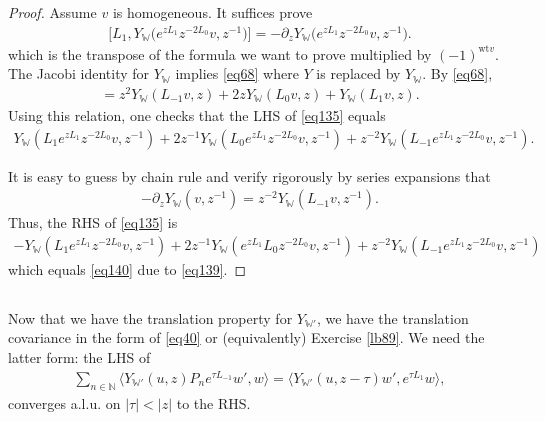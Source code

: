 \documentclass[12pt,a4paper,notitlepage]{article}
\theoremstyle{definition}
\theoremstyle{plain}
\newcommand{\bigbk}[1]{\big\langle {#1}\big\rangle}
\newcommand{\Wbb}{\mathbb W}
\newcommand{\Nbb}{\mathbb N}
\newcommand{\wt}{\mathrm{wt}}
\numberwithin{equation}{section}
\begin{document}
\begin{proof}
Assume $v$ is homogeneous. It suffices prove 
\begin{align}
\big[L_1,Y_\Wbb\big(e^{zL_1}z^{-2L_0}v,z^{-1}\big)\big]=-\partial_zY_\Wbb\big(e^{zL_1}z^{-2L_0}v,z^{-1}\big).\label{eq135}	
\end{align}
which is the transpose of the formula we want to prove multiplied by $(-1)^{\wt v}$. The Jacobi identity for $Y_\Wbb$ implies \eqref{eq68} where $Y$ is replaced by $Y_\Wbb$. By \eqref{eq68},
\begin{align}
	[L_1,Y_\Wbb(v,z)]=z^2Y_\Wbb(L_{-1}v,z)+2zY_\Wbb(L_0v,z)+Y_\Wbb(L_1v,z).	
\end{align}
Using this relation, one checks that the LHS of \eqref{eq135} equals
\begin{align}
Y_\Wbb(L_1e^{zL_1}z^{-2L_0}v,z^{-1})+2z^{-1}Y_\Wbb(L_0e^{zL_1}z^{-2L_0}v,z^{-1})+z^{-2}Y_\Wbb(L_{-1}e^{zL_1}z^{-2L_0}v,z^{-1}).\label{eq140}	
\end{align}

It is easy to guess by chain rule and verify rigorously by series expansions that
\begin{align*}
-\partial_z Y_\Wbb(v,z^{-1})=z^{-2}Y_\Wbb(L_{-1}v,z^{-1}).	
\end{align*}
Thus, the RHS of \eqref{eq135} is
\begin{align*}
-Y_\Wbb(L_1e^{zL_1}z^{-2L_0}v,z^{-1})+2z^{-1}Y_\Wbb(e^{zL_1}L_0z^{-2L_0}v,z^{-1})+z^{-2}Y_\Wbb(L_{-1}e^{zL_1}z^{-2L_0}v,z^{-1})
\end{align*}
which equals \eqref{eq140} due to \eqref{eq139}.
\end{proof}




\subsection{}


Now that we have the translation property for $Y_{\Wbb'}$, we have the translation covariance in the form of \eqref{eq40} or (equivalently) Exercise \ref{lb89}. We need the latter form: the LHS of 
\begin{align}
	\sum_{n\in\Nbb}\bigbk{Y_{\Wbb'}(u,z)P_ne^{\tau L_{-1}}w',w}=\bigbk{Y_{\Wbb'}(u,z-\tau)w',e^{\tau L_1}w},\label{eq150}
\end{align}
converges a.l.u. on $|\tau|<|z|$ to the RHS.
\end{document}
